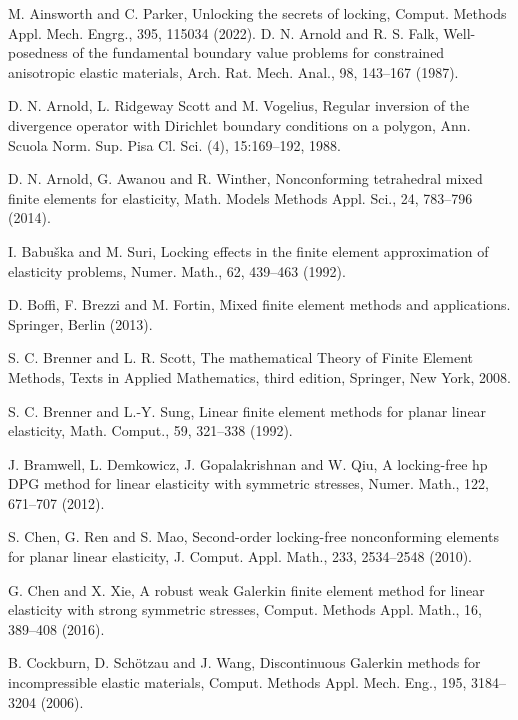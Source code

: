 \documentclass[11pt]{article}
\numberwithin{equation}{section}
\begin{document}
\begin{thebibliography}{99.}
 M. Ainsworth and C. Parker, Unlocking the secrets of locking, Comput. Methods
Appl. Mech. Engrg., 395, 115034 (2022).
 D. N.  Arnold and R. S.  Falk,  Well-posedness of the fundamental boundary value problems for constrained anisotropic elastic materials, Arch. Rat. Mech. Anal., 98, 143--167 (1987). 

 D. N. Arnold, L. Ridgeway Scott and M. Vogelius,
Regular inversion of the divergence operator with Dirichlet boundary conditions
on a polygon, Ann. Scuola Norm. Sup. Pisa Cl. Sci. (4), 15:169--192, 1988.

 D. N. Arnold, G. Awanou and  R. Winther, Nonconforming tetrahedral mixed finite elements for elasticity, Math. Models Methods Appl. Sci., 24, 783--796 (2014).

  I. Babuška and M. Suri, Locking effects in the finite element approximation of elasticity
problems, Numer. Math., 62, 439--463 (1992).

 D. Boffi, F. Brezzi and  M. Fortin, Mixed finite element methods and applications. Springer, Berlin (2013).

 S. C. Brenner and L. R. Scott, The mathematical Theory of Finite Element Methods, Texts in Applied Mathematics, third edition, Springer, New York, 2008.

 S. C. Brenner and  L.-Y. Sung, Linear finite element methods for planar linear elasticity, Math. Comput., 59, 321--338 (1992).

 J. Bramwell, L. Demkowicz, J. Gopalakrishnan and  W. Qiu, A locking-free hp DPG method for linear elasticity with symmetric stresses, Numer. Math., 122, 671--707 (2012). 

 S. Chen, G. Ren and  S. Mao, Second-order locking-free nonconforming elements for planar linear elasticity, J. Comput. Appl. Math., 233, 2534--2548 (2010).

 G. Chen and  X. Xie, A robust weak Galerkin finite element method for linear elasticity with strong symmetric stresses, Comput. Methods Appl. Math., 16, 389--408 (2016).

 B. Cockburn, D. Schötzau and J. Wang, Discontinuous Galerkin methods for incompressible elastic materials, Comput. Methods Appl. Mech. Eng., 195, 3184--3204 (2006).


\end{thebibliography}
\end{document}
